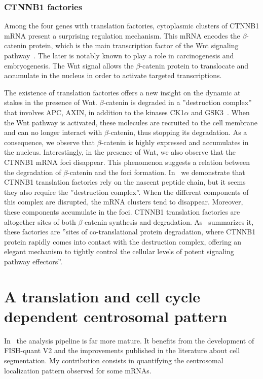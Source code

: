 \subsubsection{CTNNB1 factories}

Among the four genes with translation factories, cytoplasmic clusters of CTNNB1 \ac{mRNA} present a surprising regulation mechanism.
This \ac{mRNA} encodes the $\beta$-catenin protein, which is the main transcription factor of the Wnt signaling pathway~\cite{Grainger_2018}.
The later is notably known to play a role in carcinogenesis and embryogenesis.
The Wnt signal allows the $\beta$-catenin protein to translocate and accumulate in the nucleus in order to activate targeted transcriptions.

The existence of translation factories offers a new insight on the dynamic at stakes in the presence of Wnt.
$\beta$-catenin is degraded in a ''destruction complex'' that involves APC, AXIN, in addition to the kinases CK1$\alpha$ and GSK3~\cite{stamos_catenin_2013}.
When the Wnt pathway is activated, these molecules are recruited to the cell membrane and can no longer interact with $\beta$-catenin, thus stopping its degradation.
As a consequence, we observe that $\beta$-catenin is highly expressed and accumulates in the nucleus.
Interestingly, in the presence of Wnt, we also observe that the CTNNB1 \ac{mRNA} foci disappear.
This phenomenon suggests a relation between the degradation of $\beta$-catenin and the foci formation.
In~\cite{CHOUAIB_2020} we demonstrate that CTNNB1 translation factories rely on the nascent peptide chain, but it seems they also require the ''destruction complex''.
When the different components of this complex are disrupted, the \ac{mRNA} clusters tend to disappear.
Moreover, these components accumulate in the foci.
CTNNB1 translation factories are altogether sites of both $\beta$-catenin synthesis and degradation.
As~\cite{Chin_2020} summarizes it, these factories are ''sites of co-translational protein degradation, where CTNNB1 protein rapidly comes into contact with the destruction complex, offering an elegant mechanism to tightly control the cellular levels of potent signaling pathway effectors''.

\section{A translation and cell cycle dependent centrosomal pattern}
\label{sec:centrosomal}

In~\cite{safieddine_choreography_2021} the analysis pipeline is far more mature.
It benefits from the development of FISH-quant V2 and the improvements published in the literature about cell segmentation.
My contribution consists in quantifying the centrosomal localization pattern observed for some \ac{mRNA}s.

